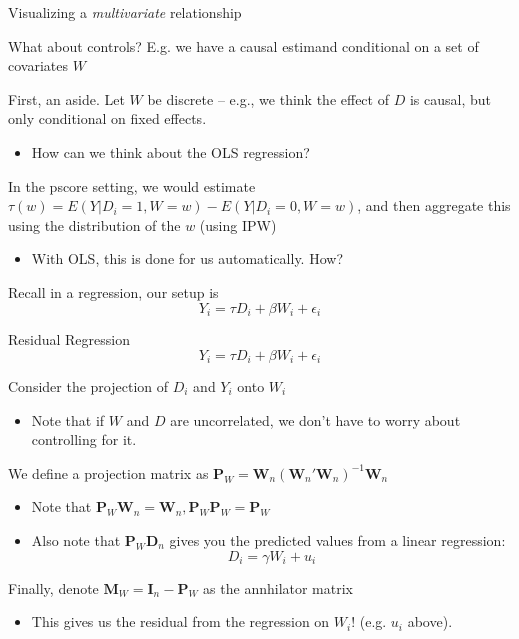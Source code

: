 \documentclass[notes,11pt, aspectratio=169]{beamer}
\newenvironment{wideitemize}{\itemize\addtolength{\itemsep}{10pt}}{\enditemize}
\begin{document}
\begin{frame}{Visualizing a \emph{multivariate} relationship}
  \begin{wideitemize}
  \item What about controls? E.g. we have a causal estimand conditional on a set of covariates $W$
  \item First, an aside. Let $W$ be discrete -- e.g., we think the
    effect of $D$ is causal, but only conditional on fixed effects.
    \begin{itemize}
    \item How can we think about the OLS regression?
    \end{itemize}
  \item In the pscore setting, we would estimate
    $\tau(w) = E(Y|D_{i}=1, W=w) - E(Y | D_{i} = 0, W = w)$, and then
    aggregate this using the distribution of the $w$ (using IPW)
    \begin{itemize}
    \item With OLS, this is done for us automatically. How?
    \end{itemize}
  \item Recall in a regression, our setup is
    $$ Y_{i} = \tau D_{i} + \beta W_{i} + \epsilon_{i}$$
  \end{wideitemize}
\end{frame}

\begin{frame}{Residual Regression}
    $$ Y_{i} = \tau D_{i} + \beta W_{i} + \epsilon_{i}$$
  \begin{wideitemize}
  \item Consider the projection of $D_{i}$ and $Y_{i}$ onto $W_{i}$ 
    \begin{itemize}
      \item Note that if $W$ and $D$ are uncorrelated, we don't have to worry about controlling for it.
      \end{itemize}
    \item We define a projection matrix as $\mathbf{P}_{W} = \mathbf{W}_{n}(\mathbf{W}_{n}'\mathbf{W}_{n})^{-1}\mathbf{W}_{n}$
      \begin{itemize}
      \item Note that $\mathbf{P}_{W}\mathbf{W}_{n} = \mathbf{W}_{n}, \mathbf{P}_{W}\mathbf{P}_{W} = \mathbf{P}_{W}$
      \item Also note that $\mathbf{P}_{W}\mathbf{D}_{n}$ gives you
        the predicted values from a linear regression:
        $$D_{i} = \gamma W_{i} + u_{i}$$
      \end{itemize}
    \item Finally, denote $\mathbf{M}_{W} = \mathbf{I}_{n} - \mathbf{P}_{W}$ as the annhilator matrix
      \begin{itemize}
      \item This gives us the residual from the regression on $W_{i}$! (e.g. $u_{i}$ above).
      \end{itemize}
  \end{wideitemize}
\end{frame}
\end{document}
